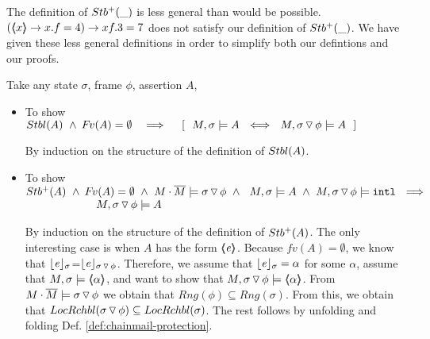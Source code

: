 %

The definition  of ${Stb^+( \_ )}$ is  less  general than would be   possible. \Eg $(\langle\!\!\langle x \rangle\!\!\rangle \rightarrow  x.f=4) \rightarrow xf.3=7$  does not satisfy our definition of ${Stb^+( \_ )}$.
We have given these less general definitions in order to simplify both our defintions and our proofs.

Take any  state  $\sigma$, frame  $\phi$,  assertion  $A$,  
 
 
\begin{itemize}
\item 
To show\\
  $\Stable{A}\ \wedge \  \fv(A)=\emptyset \ \ \  \Longrightarrow \ \  \ \  [\ \ M, \sigma \models A \ \ \Longleftrightarrow \ \  M,{\PushSLong \phi \sigma} \models A\ \ ]$

By induction on the structure of the definition of ${Stbl( A )}$.

\item 
To show\\
 $\Pos{A}\ \wedge \  \fv(A)=\emptyset \  \wedge \     {M\cdot\Mtwo \models {\PushSLong \phi \sigma}}\ \wedge\ 
  \ M, \sigma \models A \  \wedge \  M, {\PushSLong \phi \sigma} \models  \intThis \ \ \Longrightarrow$ \\
  $\strut \hspace{2cm}  \ \  M,{ \sigma \, {\triangledown}\, \phi} \models A $

By induction on the structure of the definition of ${Stb^+( A )}$.
The only interesting case is when $A$ has the form $\langle\!\!\langle \mathit{e} \rangle\!\!\rangle$. Because 
$ fv(A)=\emptyset$, we know that $\lfloor \mathit{e} \rfloor_{\sigma}$=$\lfloor \mathit{e} \rfloor_{ \sigma \, {\triangledown}\, \phi}$. Therefore, we assume that 
 $\lfloor \mathit{e} \rfloor_{\sigma} = \alpha$ for some $\alpha$, assume that $ M,  \sigma  \models \langle\!\!\langle \alpha \rangle\!\!\rangle$, and want to show that  $ M,{ \sigma \, {\triangledown}\, \phi} \models \langle\!\!\langle \alpha \rangle\!\!\rangle$. 
 From $   {M\cdot\overline{M} \models {\ensuremath{ \sigma \, {\triangledown}\, \phi}}}$ we obtain that
 $Rng(\phi) \subseteq Rng(  \sigma)  $. 
 From this, we obtain that
  $  LocRchbl( \sigma \, {\triangledown}\, \phi) \subseteq LocRchbl(\sigma)$.
  The rest follows by unfolding and folding Def. \ref{def:chainmail-protection}.

  \end{itemize}
 
